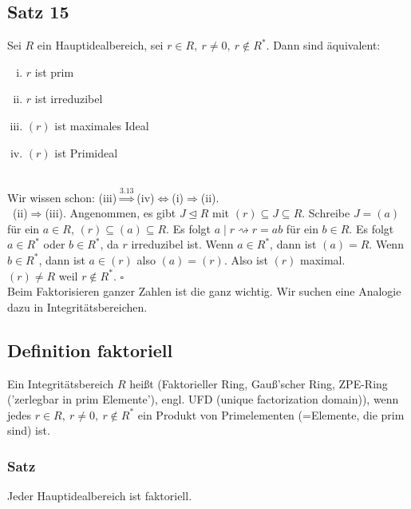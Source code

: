 
\subsection{Satz 15}
\label{sub:satz_15}
Sei $R$ ein Hauptidealbereich, sei $r\in R,~r\neq 0,~r\notin R^*$.
Dann sind äquivalent:
\begin{enumerate}[(i)]
	\item $r$ ist prim
	\item $r$ ist irreduzibel
	\item $(r)$ ist maximales Ideal
	\item $(r)$ ist Primideal
\end{enumerate}

\\
Wir wissen schon: (iii)$\stackrel{\hyperref[sub:def_vers_ideale]{3.13}}{\Rightarrow}$(iv)$\Leftrightarrow$(i)$\Rightarrow$(ii).\\
\zz~(ii)$\Rightarrow$(iii).
Angenommen, es gibt $J\trianglelefteq R$ mit $(r)\subseteq J\subseteq R$.
Schreibe $J=(a)$ für ein $a\in R$, $(r)\subseteq (a)\subseteq R$.
Es folgt $a\mid r\rightsquigarrow r=ab$ für ein $b\in R$.
Es folgt $a\in R^*$ oder $b\in R^*$, da $r$ irreduzibel ist.
Wenn $a\in R^*$, dann ist $(a)=R$.
Wenn $b\in R^*$, dann ist $a\in (r)$ also $(a)=(r)$.
Also ist $(r)$ maximal.\\
$(r)\neq R$ weil $r\notin R^*$.
\hfill $\square$\\

Beim Faktorisieren ganzer Zahlen ist die  ganz wichtig.
Wir suchen eine Analogie dazu in Integritätsbereichen.

\subsection{Definition faktoriell}
\label{sub:def_faktoriell}
Ein Integritätsbereich $R$ heißt  (Faktorieller Ring, Gauß'scher Ring, ZPE-Ring ('zerlegbar in prim Elemente'), engl. UFD (unique factorization domain)), wenn  jedes $r\in R,~r\neq 0,~r\notin R^*$ ein Produkt von Primelementen (=Elemente, die prim sind) ist.

\subsubsection*{Satz}
Jeder Hauptidealbereich ist faktoriell.\\

